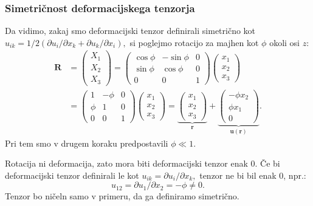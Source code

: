 \documentclass[12pt ]{article}
\begin{document}
\subsubsection{Simetričnost deformacijskega tenzorja}
Da vidimo, zakaj smo deformacijski tenzor definirali simetrično kot $u_{ik}=1/2(\partial u_i/\partial x_k+\partial u_k/\partial x_i),$ si poglejmo rotacijo za majhen kot $\phi$ okoli osi $z:$ 
\begin{align*}
\mathbf{R} &=
\begin{pmatrix}
X_1\\
X_2\\
X_3
\end{pmatrix}
=
\begin{pmatrix}
\cos\phi & -\sin\phi & 0\\
\sin\phi & \cos\phi & 0\\
0 & 0 & 1
\end{pmatrix}
\begin{pmatrix}
x_1\\
x_2\\
x_3
\end{pmatrix} \\[6pt]
%
&=
\begin{pmatrix}
1 & -\phi & 0\\
\phi & 1 & 0\\
0 & 0 & 1
\end{pmatrix}
\begin{pmatrix}
x_1\\
x_2\\
x_3
\end{pmatrix}
=
\underbrace{
\begin{pmatrix}
x_1\\
x_2\\
x_3
\end{pmatrix}}_{\mathbf r}
+
\underbrace{
\begin{pmatrix}
-\phi x_2\\
\phi x_1\\
0
\end{pmatrix}}_{\mathbf u(\mathbf r)}.
\end{align*}
Pri tem smo v drugem koraku predpostavili $\phi\ll 1$\cite{ziherl}.

Rotacija ni deformacija, zato mora biti deformacijski tenzor enak 0. Če bi deformacijski tenzor definirali le kot $u_{ik}=\partial u_i/\partial x_k,$ tenzor ne bi bil enak 0, npr.: $$u_{12}=\partial u_1/\partial x_2=-\phi\neq0.$$ Tenzor bo ničeln samo v primeru, da ga definiramo simetrično.
\end{document}

